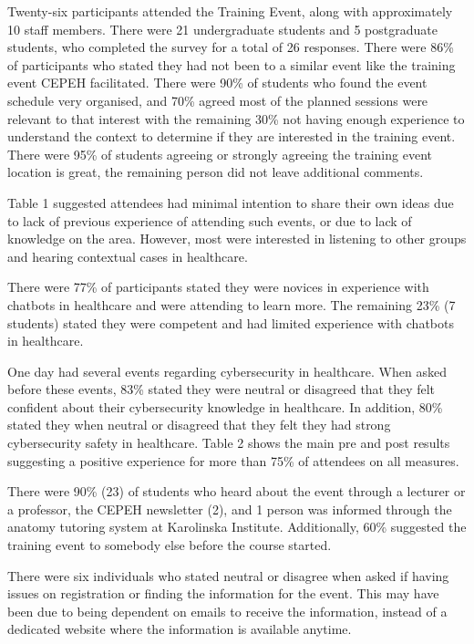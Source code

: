 \documentclass[a4paper, nobind]{templates/ociamthesis}
\begin{document}
Twenty-six participants attended the Training Event, along with approximately 10 staff members. There were 21 undergraduate students and 5 postgraduate students, who completed the survey for a total of 26 responses. There were 86\% of participants who stated they had not been to a similar event like the training event CEPEH facilitated. There were 90\% of students who found the event schedule very organised, and 70\% agreed most of the planned sessions were relevant to that interest with the remaining 30\% not having enough experience to understand the context to determine if they are interested in the training event. There were 95\% of students agreeing or strongly agreeing the training event location is great, the remaining person did not leave additional comments.

Table 1 suggested attendees had minimal intention to share their own ideas due to lack of previous experience of attending such events, or due to lack of knowledge on the area. However, most were interested in listening to other groups and hearing contextual cases in healthcare.

There were 77\% of participants stated they were novices in experience with chatbots in healthcare and were attending to learn more. The remaining 23\% (7 students) stated they were competent and had limited experience with chatbots in healthcare.

One day had several events regarding cybersecurity in healthcare. When asked before these events, 83\% stated they were neutral or disagreed that they felt confident about their cybersecurity knowledge in healthcare. In addition, 80\% stated they when neutral or disagreed that they felt they had strong cybersecurity safety in healthcare. Table 2 shows the main pre and post results suggesting a positive experience for more than 75\% of attendees on all measures.

There were 90\% (23) of students who heard about the event through a lecturer or a professor, the CEPEH newsletter (2), and 1 person was informed through the anatomy tutoring system at Karolinska Institute. Additionally, 60\% suggested the training event to somebody else before the course started.

There were six individuals who stated neutral or disagree when asked if having issues on registration or finding the information for the event. This may have been due to being dependent on emails to receive the information, instead of a dedicated website where the information is available anytime.
\end{document}
